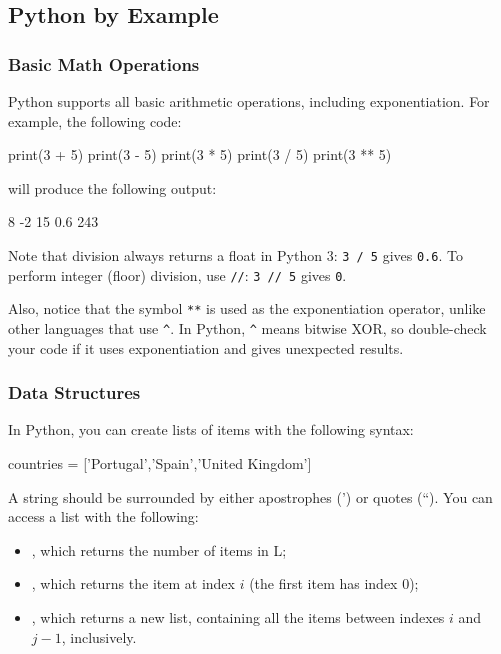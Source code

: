 
\subsection{Python by Example}

\subsubsection{Basic Math Operations}

Python supports all basic arithmetic operations, including exponentiation. For
example, the following code: \begin{python}
print(3 + 5)
print(3 - 5)
print(3 * 5)
print(3 / 5)
print(3 ** 5)
\end{python}

\noindent will produce the following output:
\begin{python}
8
-2
15
0.6
243
\end{python}

Note that division always returns a float in Python 3: \texttt{3 / 5} gives \texttt{0.6}. To perform integer (floor) division, use \texttt{//}: \texttt{3 // 5} gives \texttt{0}.

Also, notice that the symbol \texttt{**} is used as the exponentiation operator, unlike other languages that use \texttt{\^}. In Python, \texttt{\^} means bitwise XOR, so double-check your code if it uses exponentiation and gives unexpected results.

\subsubsection{Data Structures}

In Python, you can create lists of items with the following syntax:

\begin{python}
countries = ['Portugal','Spain','United Kingdom']
\end{python}

\noindent A string should be surrounded by either apostrophes (') or quotes (``). You can access a list with the following:

\begin{itemize}
 \item {}, which returns the number of items in L;
 \item {}, which returns the item at index $i$ (the first item has index 0);
 \item {}, which returns a new list, containing all the items between indexes $i$ and $j-1$, inclusively. 
\end{itemize}

